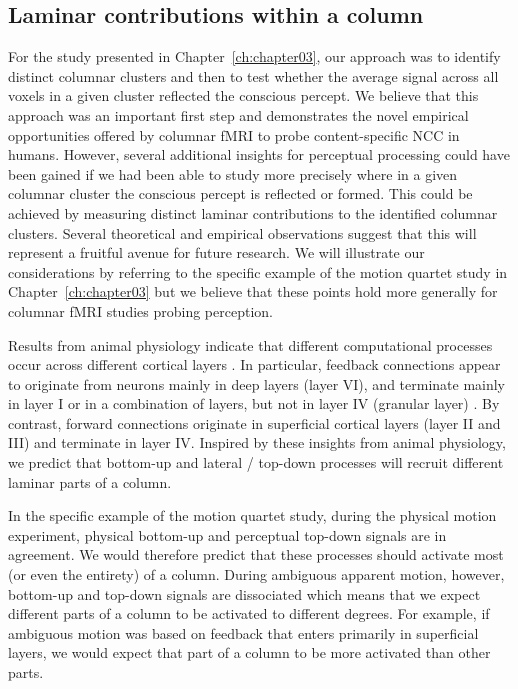 \subsection{Laminar contributions within a column}
For the study presented in Chapter~\ref{ch:chapter03}, our approach was to identify distinct columnar clusters and then to test whether the average signal across all voxels in a given cluster reflected the conscious percept. We believe that this approach was an important first step and demonstrates the novel empirical opportunities offered by columnar fMRI to probe content-specific NCC in humans. However, several additional insights for perceptual processing could have been gained if we had been able to study more precisely where in a given columnar cluster the conscious percept is reflected or formed. This could be achieved by measuring distinct laminar contributions to the identified columnar clusters. Several theoretical and empirical observations suggest that this will represent a fruitful avenue for future research. We will illustrate our considerations by referring to the specific example of the motion quartet study in Chapter~\ref{ch:chapter03} but we believe that these points hold more generally for columnar fMRI studies probing perception.

Results from animal physiology indicate that different computational processes occur across different cortical layers \parencite{Felleman1991, Rockland1979, Markov2014}. In particular, feedback connections appear to originate from neurons mainly in deep layers (layer VI), and terminate mainly in layer I or in a combination of layers, but not in layer IV (granular layer) \parencite{Rockland1994, Salin2017}. By contrast, forward connections originate in superficial cortical layers (layer II and III) and terminate in layer IV. Inspired by these insights from animal physiology, we predict that bottom-up and lateral / top-down processes will recruit different laminar parts of a column.

In the specific example of the motion quartet study, during the physical motion experiment, physical bottom-up and perceptual top-down signals are in agreement. We would therefore predict that these processes should activate most (or even the entirety) of a column. During ambiguous apparent motion, however, bottom-up and top-down signals are dissociated which means that we expect different parts of a column to be activated to different degrees. For example, if ambiguous motion was based on feedback that enters primarily in superficial layers, we would expect that part of a column to be more activated than other parts.

